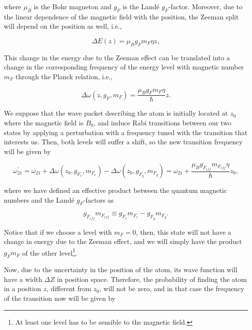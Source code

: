 \documentclass{article}
\begin{document}
where $\mu_{B}$ is the Bohr magneton and $g_{F}$ is the Landé $g_{F}$-factor. Moreover, due to the linear dependence of the magnetic field with the position, the Zeeman split will depend on the position as well, i.e.,

\begin{equation}
  \Delta E(z) = \mu_{B} g_{F} m_{F} \eta z,
\end{equation}

This change in the energy due to the Zeeman effect can be translated into a change in the corresponding frequency of the energy level with magnetic number $m_{F}$ through the Planck relation, i.e.,

\begin{equation}
  \Delta \omega(z, g_{F}, m_{F}) = \frac{\mu_{B} g_{F} m_{F} \eta}{\hbar} z.
\end{equation}

We suppose that the wave packet describing the atom is initially located at $z_{0}$ where the magnetic field is $B_{0}$, and induce Rabi transitions between our two states by applying a perturbation with a frequency tuned with the transition that interests us. Then, both levels will suffer a shift, so the new transition frequency will be given by 

\begin{equation}
  \omega_{21}^{\prime} = \omega_{21} + \Delta \omega(z_{0}, g_{F_{e}}, m_{F_{e}}) -  \Delta \omega(z_{0}, g_{F_{g}}, m_{F_{g}}) =  \omega_{21} + \frac{\mu_{B} g_{F_{eff}} m_{F_{eff}} \eta}{\hbar} z_{0},
\end{equation}

where we have defined an effective product between the quantum magnetic numbers and the Landé $g_{F}$-factors as

\begin{equation}
    g_{F_{eff}} m_{F_{eff}} \equiv g_{F_{e}} m_{F_{e}} - g_{F_{g}} m_{F_{g}}.
\end{equation}

Notice that if we choose a level with $m_{F}=0$, then, this state will not have a change in energy due to the Zeeman effect, and we will simply have the product $g_{F} m_{F}$ of the other level\footnote{At least one level has to be sensible to the magnetic field.}.

Now, due to the uncertainty in the position of the atom, its wave function will have a width $\Delta Z$ in position space. Therefore, the probability of finding the atom in a position $z$, different from $z_{0}$, will not be zero, and in that case the frequency of the transition now will be given by
\end{document}
